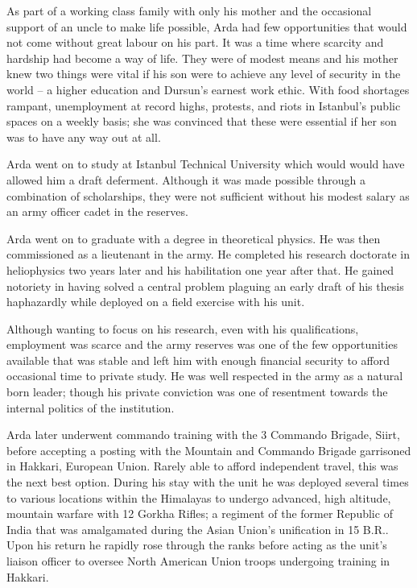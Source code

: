 As part of a working class family with only his mother and the occasional support of an uncle to make life possible, Arda had few opportunities that would not come without great labour on his part. It was a time where scarcity and hardship had become a way of life. They were of modest means and his mother knew two things were vital if his son were to achieve any level of security in the world -- a higher education and Dursun's earnest work ethic. With food shortages rampant, unemployment at record highs, protests, and riots in Istanbul's public spaces on a weekly basis; she was convinced that these were essential if her son was to have any way out at all.

Arda went on to study at Istanbul Technical University which would would have allowed him a draft deferment. Although it was made possible through a combination of scholarships, they were not sufficient without his modest salary as an army officer cadet in the reserves.

Arda went on to graduate with a degree in theoretical physics. He was then commissioned as a lieutenant in the army. He completed his research doctorate in heliophysics two years later and his habilitation one year after that. He gained notoriety in having solved a central problem plaguing an early draft of his thesis haphazardly while deployed on a field exercise with his unit.

Although wanting to focus on his research, even with his qualifications, employment was scarce and the army reserves was one of the few opportunities available that was stable and left him with enough financial security to afford occasional time to private study. He was well respected in the army as a natural born leader; though his private conviction was one of resentment towards the internal politics of the institution.

Arda later underwent commando training with the 3 Commando Brigade, Siirt, before accepting a posting with the Mountain and Commando Brigade garrisoned in Hakkari, European Union. Rarely able to afford independent travel, this was the next best option. During his stay with the unit he was deployed several times to various locations within the Himalayas to undergo advanced, high altitude, mountain warfare with 12 Gorkha Rifles; a regiment of the former Republic of India that was amalgamated during the Asian Union's unification in 15 B.R.. Upon his return he rapidly rose through the ranks before acting as the unit's liaison officer to oversee North American Union troops undergoing training in Hakkari.

